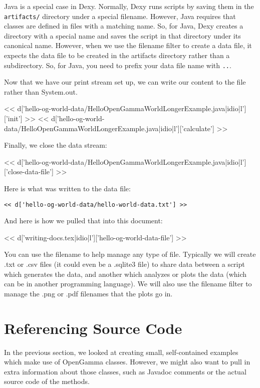 Java is a special case in Dexy. Normally, Dexy runs scripts by saving them in
the \verb|artifacts/| directory under a special filename. However, Java
requires that classes are defined in files with a matching name. So, for Java,
Dexy creates a directory with a special name and saves the script in that
directory under its canonical name. However, when we use the filename filter to
create a data file, it expects the data file to be created in the artifacts
directory rather than a subdirectory. So, for Java, you need to prefix your
data file name with \verb|..|.

Now that we have our print stream set up, we can write our content to the file
rather than System.out.

<< d['hello-og-world-data/HelloOpenGammaWorldLongerExample.java|idio|l']['init'] >>
<< d['hello-og-world-data/HelloOpenGammaWorldLongerExample.java|idio|l']['calculate'] >>

Finally, we close the data stream:

<< d['hello-og-world-data/HelloOpenGammaWorldLongerExample.java|idio|l']['close-data-file'] >>

Here is what was written to the data file:

\begin{Verbatim}
<< d['hello-og-world-data/hello-world-data.txt'] >>
\end{Verbatim}

And here is how we pulled that into this document:

<< d['writing-docs.tex|idio|l']['hello-og-world-data-file'] >>

You can use the filename to help manage any type of file. Typically we will
create .txt or .csv files (it could even be a .sqlite3 file) to share data
between a script which generates the data, and another which analyzes or plots
the data (which can be in another programming language). We will also use the
filename filter to manage the .png or .pdf filenames that the plots go in.

\section{Referencing Source Code}

In the previous section, we looked at creating small, self-contained examples
which make use of OpenGamma classes. However, we might also want to pull in
extra information about those classes, such as Javadoc comments or the actual
source code of the methods.


